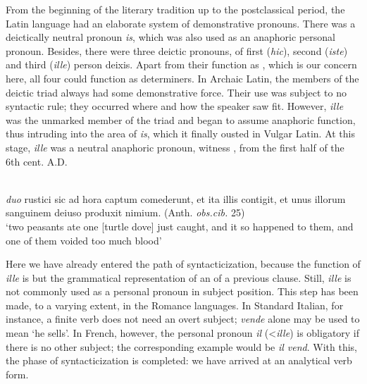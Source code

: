 From the beginning of the literary tradition up to the postclassical period, the Latin language had an elaborate system of demonstrative pronouns. There was a deictically neutral pronoun \textit{is}, which was also used as an anaphoric personal pronoun. Besides, there were three deictic pronouns, of first (\textit{hic}), second (\textit{iste}) and third (\textit{ille}) person deixis. Apart from their function as \nps, which is our concern here, all four could function as determiners. In Archaic Latin, the members of the deictic triad always had some demonstrative force. Their use was subject to no syntactic rule; they occurred where and how the speaker saw fit. However, \textit{ille} was the unmarked member of the triad and began to assume anaphoric function, thus intruding into the area of \textit{is}, which it finally ousted in Vulgar Latin. At this stage, \textit{ille} was a neutral anaphoric pronoun, witness , \enlargethispage{\baselineskip} from the first half of the 6th cent. A.D.

\ea\label{ex:E1}
 \\
\textit{duo} rustici sic ad hora captum comederunt, et ita illis contigit, et unus illorum sanguinem deiuso produxit nimium.  (Anth. \textit{obs.cib.} 25)\\
\glt ‘two peasants ate one [turtle dove] just caught, and it so happened to them, and one of them voided too much blood’ \\
\z

\noindent Here we have already entered the path of syntacticization, because the function of \textit{ille} is but the grammatical representation of an \np of a previous clause. Still, \textit{ille} is not commonly used as a personal pronoun in subject position. This step has been made, to a varying extent, in the Romance languages. In Standard Italian, for instance, a finite verb does not need an overt subject; \textit{vende} alone may be used to mean ‘he sells’. In French, however, the personal pronoun \textit{il} ({\textless}\textit{ille}) is obligatory if there is no other subject; the corresponding example would be \textit{il vend}. With this, the phase of syntacticization is completed: we have arrived at an analytical verb form.

